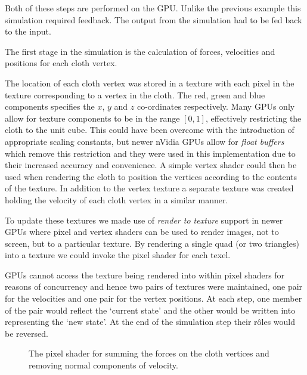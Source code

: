 Both of these steps are performed on the GPU. Unlike the previous example this
simulation required feedback. The output from the simulation had to be fed back
to the input.


The first stage in the simulation is the calculation of forces, velocities
and positions for each cloth vertex. 

The location of each cloth vertex was stored in a texture with each pixel in the
texture corresponding to a vertex in the cloth. The red, green and blue
components specifies the $x$, $y$ and $z$ co-ordinates respectively.  Many GPUs
only allow for texture components to be in the range $[0, 1]$, effectively
restricting the cloth to the unit cube. This could have been overcome with the
introduction of appropriate scaling constants, but newer nVidia GPUs allow for
\emph{float buffers} which remove this restriction and they were used in this
implementation due to their increased accuracy and convenience. A simple vertex shader
could then be used when rendering the cloth to position the vertices according to the
contents of the texture.
In addition to the vertex texture a separate texture was created holding the 
velocity of each cloth vertex in a similar manner. 

To update these textures we made use of \emph{render to texture} support in newer GPUs
where pixel and vertex shaders can be used to render images, not to screen, but to
a particular texture. By rendering a single quad (or two triangles) into a texture
we could invoke the pixel shader for each texel.

GPUs cannot access the texture being rendered into within pixel shaders for
reasons of concurrency and hence two pairs of textures were maintained, one pair
for the velocities and one pair for the vertex positions. At each step, one
member of the pair would reflect the `current state' and the other would be
written into representing the `new state'. At the end of the simulation step
their r\^oles would be reversed.


\begin{figure}[p]
\centering
\scalebox{0.7}{
\begin{minipage}{\textwidth}
\singlespacing

\end{minipage}}
\caption{\label{fig:calcForces}The pixel shader for summing the forces on the cloth vertices
and removing normal components of velocity.}
\end{figure}

